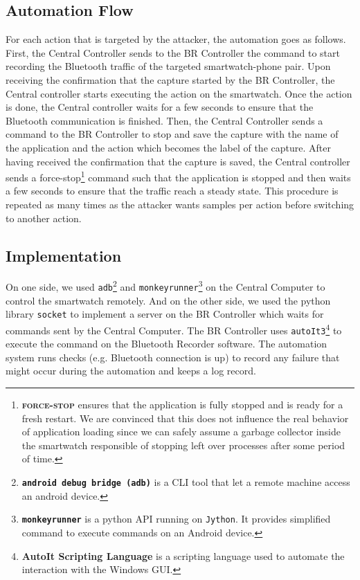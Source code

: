 \subsection{Automation Flow} For each action that is targeted by the attacker, the automation goes as follows. First, the Central Controller sends to the BR Controller the command to start recording the Bluetooth traffic of the targeted smartwatch-phone pair. Upon receiving the confirmation that the capture started by the BR Controller, the Central controller starts executing the action on the smartwatch. Once the action is done, the Central controller waits for a few seconds to ensure that the Bluetooth communication is finished. Then, the Central Controller sends a command to the BR Controller to stop and save the capture with the name of the application and the action which becomes the label of the capture. After having received the confirmation that the capture is saved, the Central controller sends a force-stop\footnote{\textbf{\textsc{force-stop}} ensures that the application is fully stopped and is ready for a fresh restart. We are convinced that this does not influence the real behavior of application loading since we can safely assume a garbage collector inside the smartwatch responsible of stopping left over processes after some period of time.} command such that the application is stopped and then waits a few seconds to ensure that the traffic reach a steady state. This procedure is repeated as many times as the attacker wants samples per action before switching to another action.


\subsection{Implementation}
On one side, we used \texttt{adb}\footnote{\textbf{\texttt{android debug bridge (adb)}} is a CLI tool that let a remote machine access an android device.} and \texttt{monkeyrunner}\footnote{\textbf{\texttt{monkeyrunner}} is a python API running on \texttt{Jython}. It provides simplified command to execute commands on an Android device.} on the Central Computer to control the smartwatch remotely. And on the other side, we used the python library \texttt{socket} to implement a server on the BR Controller which waits for commands sent by the Central Computer. The BR Controller uses \texttt{autoIt3}\footnote{\textbf{AutoIt Scripting Language} is a scripting language used to automate the interaction with the Windows GUI.} to execute the command on the Bluetooth Recorder software. The automation system runs checks (e.g. Bluetooth connection is up) to record any failure that might occur during the automation and keeps a log record.
\\


